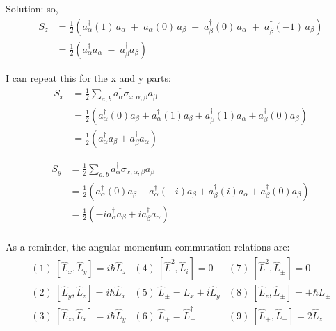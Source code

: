 \begin{homeworkProblem}
\begin{itemize}
\begin{callout}{Solution:}
                so,
                \begin{align*}
                    S_z &= \frac{1}{2} \left( a_{\alpha}^{\dagger} (1)\, a_{\alpha} \;+\; a_{\alpha}^{\dagger} (0)\, a_{\beta} \;+\; a_{\beta}^{\dagger} (0)\, a_{\alpha} \;+\; a_{\beta}^{\dagger} (-1)\, a_{\beta}\right) \\
                        &= \frac{1}{2} \left( a_{\alpha}^{\dagger} a_{\alpha} \;-\; a_{\beta}^{\dagger} a_{\beta}\right)
                \end{align*}

                I can repeat this for the x and y parts:
                \begin{align*}
                    S_x &= \frac{1}{2} \sum_{a,b} a_{\alpha}^{\dagger} \sigma_{x;\alpha,\beta} a_{\beta} \\
                    &= \frac{1}{2} \left( a_{\alpha}^{\dagger} (0) a_{\beta} + a_{\alpha}^{\dagger} (1) a_{\beta} + a_{\beta}^{\dagger} (1) a_{\alpha} + a_{\beta}^{\dagger} (0) a_{\beta} \right) \\
                    &= \frac{1}{2} \left( a_{\alpha}^{\dagger}a_{\beta} + a_{\beta}^{\dagger}a_{\alpha} \right)
                \end{align*}

                \begin{align*}
                    S_y &= \frac{1}{2} \sum_{a,b} a_{\alpha}^{\dagger} \sigma_{x;\alpha,\beta} a_{\beta} \\
                    &= \frac{1}{2} \left( a_{\alpha}^{\dagger} (0) a_{\beta} + a_{\alpha}^{\dagger} (-i) a_{\beta} + a_{\beta}^{\dagger} (i) a_{\alpha} + a_{\beta}^{\dagger} (0) a_{\beta} \right) \\
                    &= \frac{1}{2} \left( -ia_{\alpha}^{\dagger} a_{\beta} + ia_{\beta}^{\dagger} a_{\alpha} \right) \\
                \end{align*}

                As a reminder, the angular momentum commutation relations are:
                \begin{align*}
                    \begin{array}{llll}
                        (1)~[\hat{L}_{x},\hat{L}_{y}] = i\hbar\hat{L}_{z} & (4)~[\hat{L}^{2}, \hat{L}_{i}] = 0 & (7)~[\hat{L}^{2}, \hat{L}_{\pm} ] = 0 \\
                        (2)~[\hat{L}_{y},\hat{L}_{z}] = i\hbar\hat{L}_{x} & (5)~\hat{L}_{\pm} = L_{x} \pm i\hat{L}_{y} & (8)~[\hat{L}_{z}, \hat{L}_{\pm}] = \pm \hbar L_{\pm} \\
                        (3)~[\hat{L}_{z},\hat{L}_{x}] = i\hbar\hat{L}_{y} & (6)~\hat{L}_{+} = \hat{L}_{-}^{\dagger} & (9)~[\hat{L}_{+}, \hat{L}_{-}]=2\hat{L}_{z}
                    \end{array}
                \end{align*}


\end{callout}
\end{itemize}
\end{homeworkProblem}
